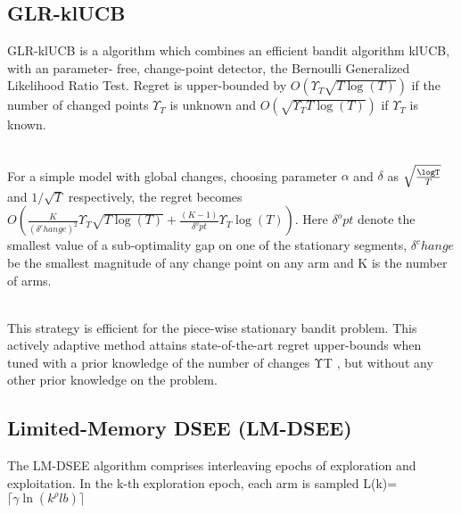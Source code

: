 \subsection{GLR-klUCB}\label{subsec:glr-klucb}
GLR-klUCB is a algorithm which combines an efficient bandit algorithm klUCB, with an parameter- free, change-point detector, the Bernoulli Generalized Likelihood Ratio Test.
Regret is upper-bounded by $ O(\Upsilon_T \sqrt{T \log(T)} )$ if the number of changed points $\Upsilon_T $ is unknown and $ O(\sqrt{\Upsilon_T T \log(T)} )$ if  $\Upsilon_T $ is known.\citep{Besson2019}


\\For a simple model with global changes, choosing parameter $\alpha$ and $\delta $ as $\sqrt{\frac{\logT}{T}}$ and $1/\sqrt{T}$ respectively, the regret becomes $O(\frac{K}{(\delta^change)^2} \Upsilon_T \sqrt{T \log(T)}+\frac{(K-1)}{\delta^opt} \Upsilon_T \log(T))$. Here $\delta^opt$ denote the smallest value of a sub-optimality gap on one of the stationary segments, $\delta^change$ be the smallest magnitude of any change point on any arm and K is the number of arms.
\citep{Besson2019}


\\This strategy is efficient for the piece-wise stationary bandit problem. This actively adaptive method attains state-of-the-art regret upper-bounds when tuned with a prior knowledge of the number of changes ΥT , but without any other prior knowledge on the problem.\citep{Besson2019}

\subsection{ Limited-Memory DSEE (LM-DSEE)}
The LM-DSEE algorithm comprises interleaving epochs of exploration and exploitation. In the k-th exploration epoch, each arm is sampled L(k)=$\lceil\gamma\ln({k^{\rho}lb})\rceil$

